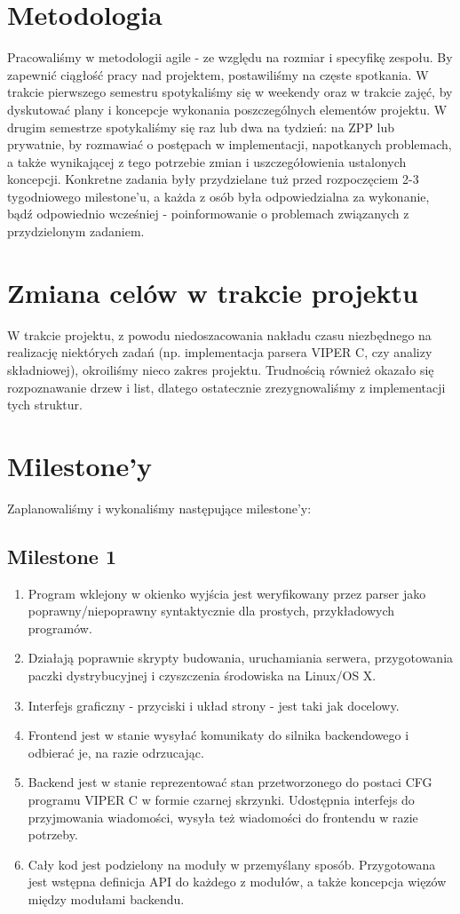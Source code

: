 \documentclass[a4paper,twoside,openright,11pt]{report}
\begin{document}
  \section {Metodologia}
\par Pracowaliśmy w metodologii agile - ze względu na rozmiar i specyfikę zespołu. By zapewnić ciągłość pracy nad projektem, postawiliśmy na częste spotkania. W trakcie pierwszego semestru spotykaliśmy się w weekendy oraz w trakcie zajęć, by dyskutować plany i koncepcje wykonania poszczególnych elementów projektu. W drugim semestrze spotykaliśmy się raz lub dwa na tydzień: na ZPP lub prywatnie, by rozmawiać o postępach w implementacji, napotkanych problemach, a także wynikającej z tego potrzebie zmian i uszczegółowienia ustalonych koncepcji. Konkretne zadania były przydzielane tuż przed rozpoczęciem 2-3 tygodniowego milestone’u, a każda z osób była odpowiedzialna za wykonanie, bądź odpowiednio wcześniej - poinformowanie o problemach związanych z przydzielonym zadaniem.

  \section {Zmiana celów w trakcie projektu}
\par W trakcie projektu, z powodu niedoszacowania nakładu czasu niezbędnego na realizację niektórych zadań (np. implementacja parsera VIPER C, czy analizy składniowej), okroiliśmy nieco zakres projektu. Trudnością również okazało się rozpoznawanie drzew i list, dlatego ostatecznie zrezygnowaliśmy z implementacji tych struktur.
  \section {Milestone'y}
\par Zaplanowaliśmy i wykonaliśmy następujące milestone'y:
  \subsection {Milestone 1}
  \begin {enumerate}
    \item Program wklejony w okienko wyjścia jest weryfikowany przez parser jako poprawny/niepoprawny syntaktycznie dla prostych, przykładowych programów.
    \item Działają poprawnie skrypty budowania, uruchamiania serwera, przygotowania paczki dystrybucyjnej i czyszczenia środowiska na Linux/OS X.
    \item Interfejs graficzny - przyciski i układ strony - jest taki jak docelowy. 
    \item Frontend jest w stanie wysyłać komunikaty do silnika backendowego i odbierać je, na razie odrzucając.
    \item Backend jest w stanie reprezentować stan przetworzonego do postaci CFG programu VIPER C w formie czarnej skrzynki. Udostępnia interfejs do przyjmowania wiadomości, wysyła też wiadomości do frontendu w razie potrzeby.
    \item Cały kod jest podzielony na moduły w przemyślany sposób.
Przygotowana jest wstępna definicja API do każdego z modułów, a także koncepcja więzów między modułami backendu.
  \end {enumerate}
\end{document}
